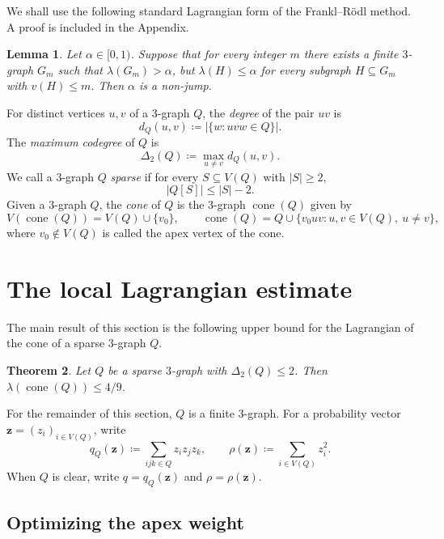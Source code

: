 \documentclass[10pt]{article}
\numberwithin{equation}{section}
\newtheorem{theorem}{Theorem}[section]
\newtheorem{lemma}[theorem]{Lemma}
\theoremstyle{definition}
\theoremstyle{remark}
\newcommand{\La}{\lambda}
\newcommand{\cone}{\operatorname{cone}}
\begin{document}
We shall use the following standard Lagrangian form of the Frankl--R\"odl method. A proof is included in the Appendix.

\begin{lemma}\label{lem:FR-criterion}
Let $\alpha\in[0,1)$. Suppose that for every integer $m$ there exists a finite $3$-graph $G_m$ such that $\La(G_m)>\alpha$, but $\La(H)\le \alpha$ for every subgraph $H\subseteq G_m$ with $v(H)\le m$. Then $\alpha$ is a non-jump.
\end{lemma}

For distinct vertices $u,v$ of a $3$-graph $Q$, the \emph{degree} of the pair $uv$ is
\[
        d_Q(u,v)
        \coloneqq |\{w \colon uvw\in Q\}|.
\]
The \emph{maximum codegree} of $Q$ is
\[
        \Delta_2(Q)
        \coloneqq \max_{u\ne v}d_Q(u,v).
\]
We call a $3$-graph $Q$ \emph{sparse} if for every $S\subseteq V(Q)$ with $|S|\ge 2$,
\[
        |Q[S]|\le |S|-2.
\]
Given a $3$-graph $Q$, the \emph{cone} of $Q$ is the $3$-graph $\cone(Q)$ given by
\[
        V(\cone(Q))=V(Q)\cup\{v_0\},
        \qquad
        \cone(Q)=Q\cup\{v_0uv \colon u,v\in V(Q),\ u\ne v\},
\]
where $v_0\notin V(Q)$ is called the apex vertex of the cone.


\section{The local Lagrangian estimate}\label{sec:local}

The main result of this section is the following upper bound for the Lagrangian of the cone of a sparse $3$-graph $Q$.

\begin{theorem}\label{thm:local-cone}
Let $Q$ be a sparse $3$-graph with $\Delta_2(Q)\le2$. Then $\La(\cone(Q))\le 4/9$.
\end{theorem}

For the remainder of this section, $Q$ is a finite $3$-graph. For a probability vector $\mathbf{z}=(z_i)_{i\in V(Q)}$, write
\[
        q_Q(\mathbf{z}) \coloneqq \sum_{ijk\in Q}z_iz_jz_k,
        \qquad
        \rho(\mathbf{z}) \coloneqq \sum_{i\in V(Q)}z_i^2.
\]
When $Q$ is clear, write $q=q_Q(\mathbf{z})$ and $\rho=\rho(\mathbf{z})$.

\subsection{Optimizing the apex weight}
\end{document}
